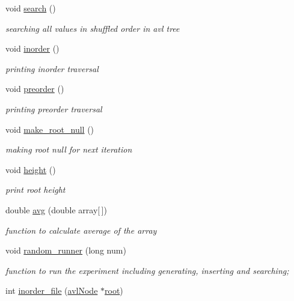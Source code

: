 \begin{DoxyCompactItemize}
void \hyperlink{class_a_v_ltree_1_1utility_a3ad33261efae427295a70173916dcdba}{search} ()
\begin{DoxyCompactList}\small\item\em searching all values in shuffled order in avl tree \end{DoxyCompactList}\item 
void \hyperlink{class_a_v_ltree_1_1utility_a745b29a61be790d48f3872cbbcc3200d}{inorder} ()
\begin{DoxyCompactList}\small\item\em printing inorder traversal \end{DoxyCompactList}\item 
void \hyperlink{class_a_v_ltree_1_1utility_a20369b889532ea30b797527cc874d412}{preorder} ()
\begin{DoxyCompactList}\small\item\em printing preorder traversal \end{DoxyCompactList}\item 
void \hyperlink{class_a_v_ltree_1_1utility_a59e048dc2e914e87be6900615aac1499}{make\-\_\-root\-\_\-null} ()
\begin{DoxyCompactList}\small\item\em making root null for next iteration \end{DoxyCompactList}\item 
void \hyperlink{class_a_v_ltree_1_1utility_a052cc2f33fa3068d5cc5db3f91a7540d}{height} ()
\begin{DoxyCompactList}\small\item\em print root height \end{DoxyCompactList}\item 
double \hyperlink{class_a_v_ltree_1_1utility_a00752977e7e3f80a84b50ec0b3440e3d}{avg} (double array\mbox{[}$\,$\mbox{]})
\begin{DoxyCompactList}\small\item\em function to calculate average of the array \end{DoxyCompactList}\item 
void \hyperlink{class_a_v_ltree_1_1utility_aa97cbd19c06e2542eb7aad1f93757957}{random\-\_\-runner} (long num)
\begin{DoxyCompactList}\small\item\em function to run the experiment including generating, inserting and searching; \end{DoxyCompactList}\item 
int \hyperlink{class_a_v_ltree_1_1utility_adfd05cec6e81f1e775f31a52ad76bdc7}{inorder\-\_\-file} (\hyperlink{namespace_a_v_ltree_a563d9b152f0d58a69308eeec8d716882}{avl\-Node} $\ast$\hyperlink{class_a_v_ltree_1_1utility_ad280714781d2107450345a21a1363931}{root})

\end{DoxyCompactItemize}
